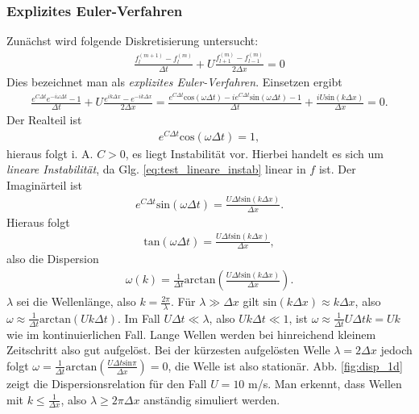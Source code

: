 \documentclass{book}
\renewcommand{\sin}{\text{sin}}
\renewcommand{\cos}{\text{cos}}
\renewcommand{\tan}{\text{tan}}
\renewcommand{\arctan}{\text{arctan}}
\begin{document}
\subsubsection{Explizites Euler-Verfahren}
\label{sec:explizites_euler-verfahren}

Zunächst wird folgende Diskretisierung untersucht:
%
\begin{eqnarray}
\frac{f_l^{(m + 1)} - f_l^{(m)}}{\Delta t} + U\frac{f_{l + 1}^{(m)} - f_{l - 1}^{(m)}}{2\Delta x} = 0
\end{eqnarray}
%
Dies bezeichnet man als \textit{explizites Euler-Verfahren}. Einsetzen ergibt
%
\begin{eqnarray}
\frac{e^{C\Delta t}e^{-i\omega\Delta t} - 1}{\Delta t} + U \frac{e^{ik\Delta x} - e^{-ik\Delta x}}{2\Delta x} = \frac{e^{C\Delta t}\cos\left(\omega\Delta t\right) - ie^{C\Delta t}\sin\left(\omega\Delta t\right) - 1}{\Delta t} + \frac{iU\sin\left( k\Delta x\right)}{\Delta x} = 0.
\end{eqnarray}
%
Der Realteil ist
%
\begin{eqnarray}
e^{C\Delta t}\cos\left(\omega\Delta t\right) = 1, 
\end{eqnarray}
%
hieraus folgt i. A. $C> 0$, es liegt Instabilität vor. Hierbei handelt es sich um \textit{lineare Instabilität}, da Glg. \eqref{eq:test_lineare_instab} linear in $f$ ist. Der Imaginärteil ist
%
\begin{eqnarray}
e^{C\Delta t}\sin\left(\omega\Delta t\right) = \frac{U\Delta t\sin\left(k\Delta x\right)}{\Delta x}.
\end{eqnarray}
%
Hieraus folgt
%
\begin{eqnarray}
\tan\left(\omega\Delta t\right) = \frac{U\Delta t\sin\left(k\Delta x\right)}{\Delta x}, 
\end{eqnarray}
%
also die Dispersion
%
\begin{eqnarray}
\omega\left(k\right) = \frac{1}{\Delta t}\arctan\left(\frac{U\Delta t\sin\left(k\Delta x\right)}{\Delta x}\right).
\end{eqnarray}
%
$\lambda$ sei die Wellenlänge, also $k = \frac{2\pi}{\lambda}$. Für $\lambda\gg \Delta x$ gilt $\sin\left(k\Delta x\right) \approx k\Delta x$, also $\omega \approx \frac{1}{\Delta t}\arctan\left(Uk\Delta t\right)$. Im Fall $U\Delta t\ll \lambda$, also $Uk\Delta t\ll 1$, ist $\omega \approx \frac{1}{\Delta t}U\Delta t k = Uk$ wie im kontinuierlichen Fall. Lange Wellen werden bei hinreichend kleinem Zeitschritt also gut aufgelöst. Bei der kürzesten aufgelösten Welle $\lambda = 2\Delta x$ jedoch folgt $\omega = \frac{1}{\Delta t}\arctan\left(\frac{U\Delta t\sin\pi}{\Delta x}\right) = 0$, die Welle ist also stationär. Abb. \ref{fig:disp_1d} zeigt die Dispersionsrelation für den Fall $U = 10$ m/s. Man erkennt, dass Wellen mit $k\leq \frac{1}{\Delta x}$, also $\lambda\geq 2\pi\Delta x$ anständig simuliert werden.
\end{document}
